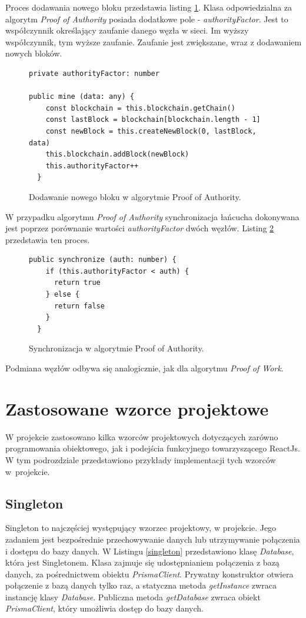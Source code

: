 \documentclass[a4paper,12pt]{book}
\begin{document}
Proces dodawania nowego bloku przedstawia listing \ref{PoABlock}. Klasa odpowiedzialna za algorytm \textit{Proof of Authority} posiada dodatkowe pole - \textit{authorityFactor}. Jest to współczynnik określający zaufanie danego węzła w sieci. Im wyższy współczynnik, tym wyższe zaufanie. Zaufanie jest zwiększane, wraz z dodawaniem nowych bloków.
 
\begin{figure}[H]  
  \centering
\begin{lstlisting}[style=ES6]
private authorityFactor: number

public mine (data: any) {
    const blockchain = this.blockchain.getChain()
    const lastBlock = blockchain[blockchain.length - 1]
    const newBlock = this.createNewBlock(0, lastBlock, data)
    this.blockchain.addBlock(newBlock)
    this.authorityFactor++
  }
\end{lstlisting}
\caption{Dodawanie nowego bloku w algorytmie Proof of Authority.}
\label{PoABlock}
\end{figure}
W przypadku algorytmu \textit{Proof of Authority} synchronizacja łańcucha dokonywana jest poprzez porównanie wartości \textit{authorityFactor} dwóch węzłów. Listing \ref{PoASync} przedstawia ten proces.

\begin{figure}[H]  
  \centering
\begin{lstlisting}[style=ES6]
public synchronize (auth: number) {
    if (this.authorityFactor < auth) {
      return true
    } else {
      return false
    }
  }
\end{lstlisting}
\caption{Synchronizacja w algorytmie Proof of Authority.}
\label{PoASync}
\end{figure}
Podmiana węzłów odbywa się analogicznie, jak dla algorytmu \textit{Proof of Work}.


\section{Zastosowane wzorce projektowe}
W projekcie zastosowano kilka wzorców projektowych dotyczących zarówno programowania obiektowego, jak i podejścia funkcyjnego towarzyszącego ReactJs. W tym podrozdziale przedstawiono przykłady implementacji tych wzorców w~projekcie.

\subsection{Singleton}
Singleton to najczęściej występujący wzorzec projektowy, w projekcie. Jego zadaniem jest bezpośrednie przechowywanie danych lub utrzymywanie połączenia i dostępu do bazy danych. W Listingu \ref{singleton} przedstawiono klasę \textit{Database}, która jest Singletonem. Klasa zajmuje się udostępnianiem połączenia z bazą danych, za pośrednictwem obiektu \textit{PrismaClient}. Prywatny konstruktor otwiera połączenie z bazą danych tylko raz, a statyczna metoda \textit{getInstance} zwraca instancję klasy \textit{Database}. Publiczna metoda \textit{getDatabase} zwraca obiekt \textit{PrismaClient}, który umożliwia dostęp do bazy danych.
\end{document}
